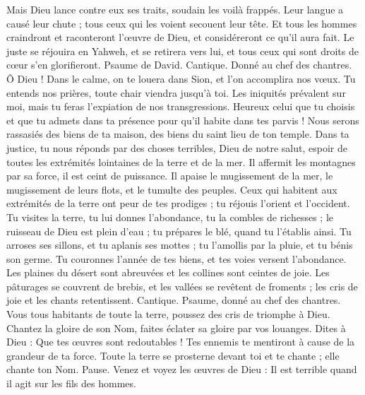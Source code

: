\begin{multicols}{2}
Mais Dieu lance contre eux ses traits, soudain les voilà frappés.
Leur langue a causé leur chute ; tous ceux qui les voient secouent leur tête.
Et tous les hommes craindront et raconteront l'œuvre de Dieu, et considéreront ce qu'il aura fait.
Le juste se réjouira en Yahweh, et se retirera vers lui, et tous ceux qui sont droits de cœur s'en glorifieront.
\VerseOne{}Psaume de David. Cantique. Donné au chef des chantres.
Ô Dieu ! Dans le calme, on te louera dans Sion, et l’on accomplira nos vœux.
Tu entends nos prières, toute chair viendra jusqu'à toi.
Les iniquités prévalent sur moi, mais tu feras l'expiation de nos transgressions.
Heureux celui que tu choisis et que tu admets dans ta présence pour qu'il habite dans tes parvis ! Nous serons rassasiés des biens de ta maison, des biens du saint lieu de ton temple.
Dans ta justice, tu nous réponds par des choses terribles, Dieu de notre salut, espoir de toutes les extrémités lointaines de la terre et de la mer.
Il affermit les montagnes par sa force, il est ceint de puissance.
Il apaise le mugissement de la mer, le mugissement de leurs flots, et le tumulte des peuples.
Ceux qui habitent aux extrémités de la terre ont peur de tes prodiges ; tu réjouis l'orient et l'occident.
Tu visites la terre, tu lui donnes l’abondance, tu la combles de richesses ; le ruisseau de Dieu est plein d'eau ; tu prépares le blé, quand tu l'établis ainsi.
Tu arroses ses sillons, et tu aplanis ses mottes ; tu l'amollis par la pluie, et tu bénis son germe.
Tu couronnes l'année de tes biens, et tes voies versent l’abondance.
Les plaines du désert sont abreuvées et les collines sont ceintes de joie.
Les pâturages se couvrent de brebis, et les vallées se revêtent de froments ; les cris de joie et les chants retentissent.
\VerseOne{}Cantique. Psaume, donné au chef des chantres. Vous tous habitants de toute la terre, poussez des cris de triomphe à Dieu.
Chantez la gloire de son Nom, faites éclater sa gloire par vos louanges.
Dites à Dieu : Que tes œuvres sont redoutables ! Tes ennemis te mentiront à cause de la grandeur de ta force.
Toute la terre se prosterne devant toi et te chante ; elle chante ton Nom. Pause.
Venez et voyez les œuvres de Dieu : Il est terrible quand il agit sur les fils des hommes.

\end{multicols}
